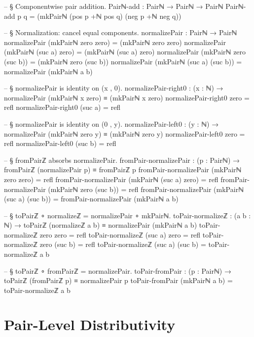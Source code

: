\documentclass[11pt,a4paper]{book}
\begin{document}
\begin{code}
-- § Componentwise pair addition.
Pairℕ-add : Pairℕ → Pairℕ → Pairℕ
Pairℕ-add p q = (mkPairℕ (pos p +ℕ pos q) (neg p +ℕ neg q))

-- § Normalization: cancel equal components.
normalizePair : Pairℕ → Pairℕ
normalizePair (mkPairℕ zero zero) = (mkPairℕ zero zero)
normalizePair (mkPairℕ (suc a) zero) = (mkPairℕ (suc a) zero)
normalizePair (mkPairℕ zero (suc b)) = (mkPairℕ zero (suc b))
normalizePair (mkPairℕ (suc a) (suc b)) = normalizePair (mkPairℕ a b)

-- § normalizePair is identity on (x , 0).
normalizePair-right0 : (x : ℕ) → normalizePair (mkPairℕ x zero) ≡ (mkPairℕ x zero)
normalizePair-right0 zero = refl
normalizePair-right0 (suc a) = refl

-- § normalizePair is identity on (0 , y).
normalizePair-left0 : (y : ℕ) → normalizePair (mkPairℕ zero y) ≡ (mkPairℕ zero y)
normalizePair-left0 zero = refl
normalizePair-left0 (suc b) = refl

-- § fromPairℤ absorbs normalizePair.
fromPair-normalizePair : (p : Pairℕ) → fromPairℤ (normalizePair p) ≡ fromPairℤ p
fromPair-normalizePair (mkPairℕ zero zero) = refl
fromPair-normalizePair (mkPairℕ (suc a) zero) = refl
fromPair-normalizePair (mkPairℕ zero (suc b)) = refl
fromPair-normalizePair (mkPairℕ (suc a) (suc b)) = fromPair-normalizePair (mkPairℕ a b)

-- § toPairℤ ∘ normalizeℤ = normalizePair ∘ mkPairℕ.
toPair-normalizeℤ : (a b : ℕ) → toPairℤ (normalizeℤ a b) ≡ normalizePair (mkPairℕ a b)
toPair-normalizeℤ zero zero = refl
toPair-normalizeℤ (suc a) zero = refl
toPair-normalizeℤ zero (suc b) = refl
toPair-normalizeℤ (suc a) (suc b) = toPair-normalizeℤ a b

-- § toPairℤ ∘ fromPairℤ = normalizePair.
toPair-fromPair : (p : Pairℕ) → toPairℤ (fromPairℤ p) ≡ normalizePair p
toPair-fromPair (mkPairℕ a b) = toPair-normalizeℤ a b
\end{code}

\section{Pair-Level Distributivity}
\end{document}
